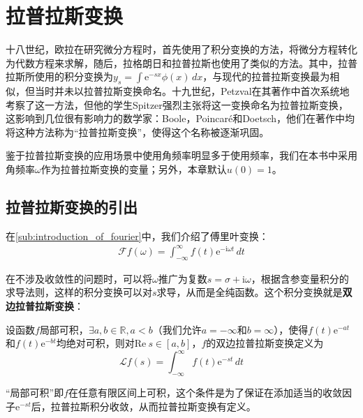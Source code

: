 \documentclass{ctexbook}
\begin{document}
\section{拉普拉斯变换}\label{sec:Laplace_Transform}

十八世纪，欧拉在研究微分方程时，首先使用了积分变换的方法，将微分方程转化为代数方程来求解，随后，拉格朗日和拉普拉斯也使用了类似的方法。其中，拉普拉斯所使用的积分变换为$y_s=\int \mathrm{e}^{-sx}\phi(x)\,dx$，与现代的拉普拉斯变换最为相似，但当时并未以拉普拉斯变换命名。十九世纪，Petzval在其著作中首次系统地考察了这一方法，但他的学生Spitzer强烈主张将这一变换命名为拉普拉斯变换，这影响到几位很有影响力的数学家：Boole，Poincaré和Doetsch，他们在著作中均将这种方法称为“拉普拉斯变换”，使得这个名称被逐渐巩固。


鉴于拉普拉斯变换的应用场景中使用角频率明显多于使用频率，我们在本书中采用角频率$\omega$作为拉普拉斯变换的变量；另外，本章默认$u(0)=1$。

\subsection{拉普拉斯变换的引出}\label{sub:introduction_of_laplace}
在\ref{sub:introduction_of_fourier}中，我们介绍了傅里叶变换：\begin{align*}
    \mathcal{F} f(\omega)=\int_{-\infty}^{\infty}f(t)\mathrm{e}^{-\mathrm{i}\omega t}\,dt
\end{align*}

在不涉及收敛性的问题时，可以将$\omega$推广为复数$s=\sigma+\mathrm{i}\omega$，根据含参变量积分的求导法则，这样的积分变换可以对$s$求导，从而是全纯函数。这个积分变换就是\textbf{双边拉普拉斯变换}：
\begin{definition}[双边拉普拉斯变换]
    设函数$f$局部可积，$\exists a,b\in\mathbb{R},a<b$（我们允许$a=-\infty$和$b=\infty$），使得$f(t)\mathrm{e}^{-at}$和$f(t)\mathrm{e}^{-bt}$均绝对可积，则对$\text{Re}\ s\in[a,b]$，$f$的双边拉普拉斯变换定义为
    \[\mathcal{L}f(s)=\int_{-\infty}^{\infty}f(t)\mathrm{e}^{-st}\,dt\]
\end{definition}
“局部可积”即$f$在任意有限区间上可积，这个条件是为了保证在添加适当的收敛因子$\mathrm{e}^{-st}$后，拉普拉斯积分收敛，从而拉普拉斯变换有定义。
\end{document}
